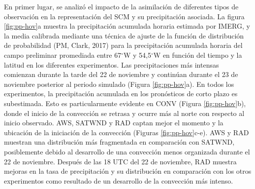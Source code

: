 \documentclass[12pt,oneside,a4paper]{reedthesis}
\begin{document}
En primer lugar, se analizó el impacto de la asimilación de diferentes tipos de observación en la representación del SCM y su precipitación asociada. La figura \ref{fig:pp-hov}a muestra la precipitación acumulada horaria estimada por IMERG, y la media calibrada mediante una técnica de ajuste de la función de distribución de probabilidad (PM, Clark, 2017) para la precipitación acumulada horaria del campo preliminar promediada entre 67\(^{\circ}\)W y 54,5\(^{\circ}\)W en función del tiempo y la latitud en los diferentes experimentos. Las precipitaciones más intensas comienzan durante la tarde del 22 de noviembre y continúan durante el 23 de noviembre posterior al periodo simulado (Figura \ref{fig:pp-hov}a). En todos los experimentos, la precipitación acumulada en los pronósticos de corto plazo es subestimada. Esto es particularmente evidente en CONV (Figura \ref{fig:pp-hov}b), donde el inicio de la convección se retrasa y ocurre más al norte con respecto al inicio observado. AWS, SATWND y RAD captan mejor el momento y la ubicación de la iniciación de la convección (Figuras \ref{fig:pp-hov}c-e). AWS y RAD muestran una distribución más fragmentada en comparación con SATWND, posiblemente debido al desarrollo de una convección menos organizada durante el 22 de noviembre. Después de las 18 UTC del 22 de noviembre, RAD muestra mejoras en la tasa de precipitación y su distribución en comparación con los otros experimentos como resultado de un desarrollo de la convección más intenso.
\end{document}
